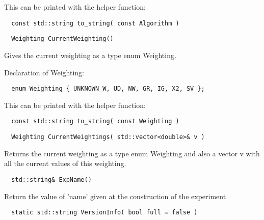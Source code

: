 This can be printed with the helper function: 

\begin{footnotesize}
\begin{verbatim}
  const std::string to_string( const Algorithm )
\end{verbatim}
\end{footnotesize}

\begin{footnotesize}
\begin{verbatim}
  Weighting CurrentWeighting()
\end{verbatim}
\end{footnotesize}

Gives the current weighting as a type enum Weighting.

Declaration of Weighting:
\begin{footnotesize}
\begin{verbatim}
  enum Weighting { UNKNOWN_W, UD, NW, GR, IG, X2, SV };
\end{verbatim}
\end{footnotesize}

This can be printed with the helper function: 

\begin{footnotesize}
\begin{verbatim}
  const std::string to_string( const Weighting )
\end{verbatim}
\end{footnotesize}


\begin{footnotesize}
\begin{verbatim}
  Weighting CurrentWeightings( std::vector<double>& v )
\end{verbatim}
\end{footnotesize}


Returns the current weighting as a type enum Weighting and also a
vector v with all the current values of this weighting.

\begin{footnotesize}
\begin{verbatim}
  std::string& ExpName()
\end{verbatim}
\end{footnotesize}


Return the value of 'name' given at the construction of the experiment


\begin{footnotesize}
\begin{verbatim}
  static std::string VersionInfo( bool full = false )
\end{verbatim}
\end{footnotesize}


